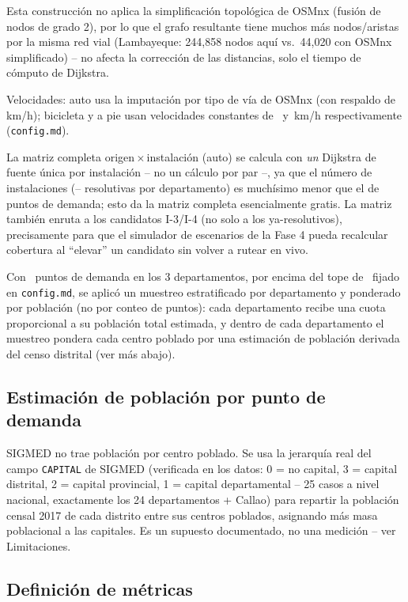 \documentclass[11pt]{article}
\begin{document}
Esta construcción no aplica la simplificación topológica de OSMnx (fusión
de nodos de grado 2), por lo que el grafo resultante tiene muchos más
nodos/aristas por la misma red vial (Lambayeque: 244{,}858 nodos aquí vs.\
44{,}020 con OSMnx simplificado) -- no afecta la corrección de las
distancias, solo el tiempo de cómputo de Dijkstra.

Velocidades: auto usa la imputación por tipo de vía de OSMnx (con
respaldo de \statSpeedCar\,km/h); bicicleta y a pie usan velocidades
constantes de \statSpeedBike\ y \statSpeedFoot\,km/h respectivamente
(\texttt{config.md}).

La matriz completa origen\,$\times$\,instalación (auto) se calcula con
\emph{un} Dijkstra de fuente única por instalación -- no un cálculo por
par --, ya que el número de instalaciones (\statMinResolutivePerDept--\statMaxResolutivePerDept
resolutivas por departamento) es muchísimo menor que el de puntos de demanda; esto da la
matriz completa esencialmente gratis. La matriz también enruta a los
candidatos I-3/I-4 (no solo a los ya-resolutivos), precisamente para que
el simulador de escenarios de la Fase 4 pueda recalcular cobertura al
``elevar'' un candidato sin volver a rutear en vivo.

Con \statNCentrosPoblados\ puntos de demanda en los 3 departamentos, por
encima del tope de \statMaxDemandPoints\ fijado en \texttt{config.md}, se
aplicó un muestreo
estratificado por departamento y ponderado por población (no por conteo
de puntos): cada departamento recibe una cuota proporcional a su
población total estimada, y dentro de cada departamento el muestreo
pondera cada centro poblado por una estimación de población derivada del
censo distrital (ver más abajo).

\subsection{Estimación de población por punto de demanda}

SIGMED no trae población por centro poblado. Se usa la jerarquía real del
campo \texttt{CAPITAL} de SIGMED (verificada en los datos: 0 = no capital,
3 = capital distrital, 2 = capital provincial, 1 = capital departamental
-- 25 casos a nivel nacional, exactamente los 24 departamentos + Callao)
para repartir la población censal 2017 de cada distrito entre sus centros
poblados, asignando más masa poblacional a las capitales. Es un supuesto
documentado, no una medición -- ver Limitaciones.

\subsection{Definición de métricas}
\end{document}
